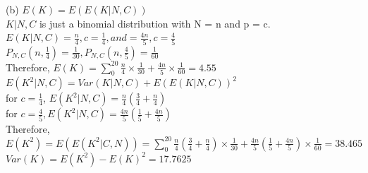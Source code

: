\documentclass[11pt]{article}
\begin{document}
   (b) $E(K) = E(E(K|N,C))$\\
   $K|N,C $ is just a binomial distribution with N = n and p = c.\\
   $E(K|N,C) = \frac{n}{4}, c = \frac{1}{4}, and = \frac{4n}{5}, c = \frac{4}{5}$   \\
   $P_{N,C}(n, \frac{1}{4}) = \frac{1}{30},P_{N,C}(n, \frac{4}{5}) = \frac{1}{60} $\\
   Therefore, $E(K) = \sum_{0}^{20} \frac{n}{4} \times \frac{1}{30} + \frac{4n}{5} \times \frac{1}{60} = 4.55$\\
   
   $E(K^2|N,C) = Var(K|N,C) + E(E(K|N,C))^2$\\
   for $c = \frac{1}{4}$, $E(K^2|N,C)  = \frac{n}{4}(\frac{3}{4} + \frac{n}{4})$\\
   for $c = \frac{4}{5}, E(K^2|N,C) = \frac{4n}{5}(\frac{1}{5}+ \frac{4n}{5})$\\
   Therefore, $E(K^2) = E(E(K^2|C,N)) = \sum_{0}^{20} \frac{n}{4}(\frac{3}{4} + \frac{n}{4})\times \frac{1}{30} + \frac{4n}{5}(\frac{1}{5}+ \frac{4n}{5})\times \frac{1}{60} = 38.465 $\\
   $Var(K) = E(K^2) - E(K)^2 = 17.7625$
 


  
\end{document}
